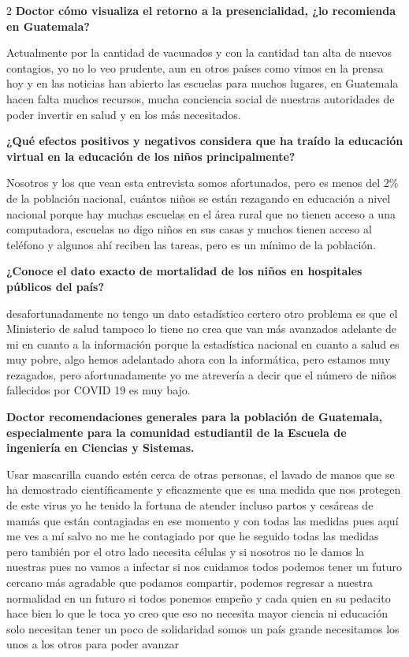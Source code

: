 \documentclass[12pt,spanish,Letterpaper,openany]{book}
\begin{document}
\begin {multicols}{2}
\textbf{Doctor cómo visualiza el retorno a la presencialidad, ¿lo recomienda en Guatemala?}

Actualmente por la cantidad de vacunados y con la cantidad tan alta de nuevos contagios, yo
no lo veo prudente, aun en otros países como vimos en la prensa hoy y en las noticias han
abierto las escuelas para muchos lugares, en Guatemala hacen falta muchos recursos, mucha
conciencia social de nuestras autoridades de poder invertir en salud y en los más necesitados.

\textbf{¿Qué efectos positivos y negativos considera que ha traído la educación virtual en la educación de los niños principalmente?}

Nosotros y los que vean esta entrevista somos afortunados, pero es menos del 2\% de la
población nacional, cuántos niños se están rezagando en educación a nivel nacional porque
hay muchas escuelas en el área rural que no tienen acceso a una computadora, escuelas no
digo niños en sus casas y muchos tienen acceso al teléfono y algunos ahí reciben las tareas,
pero es un mínimo de la población.

\textbf{¿Conoce el dato exacto de mortalidad de los niños en hospitales públicos del país?}

desafortunadamente no tengo un dato estadístico certero otro problema es que el Ministerio
de salud tampoco lo tiene no crea que van más avanzados adelante de mi en cuanto a la
información porque la estadística nacional en cuanto a salud es muy pobre, algo hemos
adelantado ahora con la informática, pero estamos muy rezagados, pero afortunadamente yo
me atrevería a decir que el número de niños fallecidos por COVID 19 es muy bajo.

\textbf{Doctor recomendaciones generales para la población de Guatemala, especialmente para la comunidad estudiantil de la Escuela de ingeniería en Ciencias y Sistemas.}

Usar mascarilla cuando estén cerca de otras personas, el lavado de manos que se ha
demostrado científicamente y eficazmente que es una medida que nos protegen de este virus
yo he tenido la fortuna de atender incluso partos y cesáreas de mamás que están contagiadas
en ese momento y con todas las medidas pues aquí me ves a mí salvo no me he contagiado
por que he seguido todas las medidas pero también por el otro lado necesita células y si
nosotros no le damos la nuestras pues no vamos a infectar si nos cuidamos todos podemos
tener un futuro cercano más agradable que podamos compartir, podemos regresar a nuestra
normalidad en un futuro si todos ponemos empeño y cada quien en su pedacito hace bien lo
que le toca yo creo que eso no necesita mayor ciencia ni educación solo necesitan tener un
poco de solidaridad somos un país grande necesitamos los unos a los otros para poder
avanzar

\end {multicols}
\end{document}
